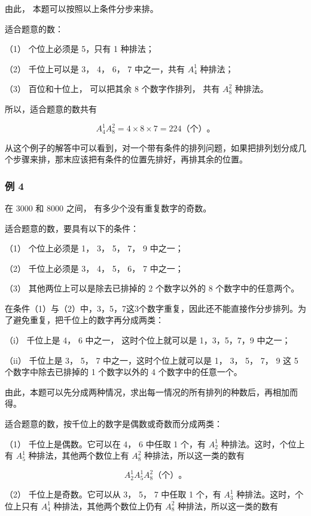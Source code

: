 由此， 本题可以按照以上条件分步来排。

 适合题意的数：

（1） 个位上必须是 5，只有 1 种排法；

（2） 千位上可以是 3， 4， 6， 7 中之一，共有 \(A_4^1\) 种排法；

（3） 百位和十位上， 可以把其余 8 个数字作排列， 共有 \(A_8^2\) 种排法。

所以，适合题意的数共有

\[
A_4^1A_8^2=4\times8\times7=224\text{（个）}\text{。}
\]

从这个例子的解答中可以看到，对一个带有条件的排列问题，如果把排列划分成几个步骤来排，那末应该把有条件的位置先排好，再排其余的位置。

\subsubsection{例 4}

在 3000 和 8000 之间， 有多少个没有重复数字的奇数。

 适合题意的数，要具有以下的条件：

（1） 个位上必须是 1， 3， 5， 7， 9 中之一；

（2） 千位上必须是 3， 4， 5， 6， 7 中之一；

（3） 其他两位上可以是除去已排掉的 2 个数字以外的 8 个数字中的任意两个。

在条件（1）与（2）中，3，5，7这3个数字重复，因此还不能直接作分步排列。为了避免重复，把千位上的数字再分成两类：

（i） 千位上是 4， 6 中之一， 这时个位上就可以是 1，3，5，7，9 中之一；

（ii） 千位上是 3， 5， 7 中之一，这时个位上就可以是 1， 3， 5， 7， 9
这 5 个数字中除去已排掉的 1 个数字以外的 4 个数字中的任意一个。

由此，本题可以先分成两种情况，求出每一情况的所有排列的种数后，再相加而得。


适合题意的数，按千位上的数字是偶数或奇数而分成两类：

（1） 千位上是偶数。它可以在 4， 6 中任取 1 个，有 \(A_2^1\)
种排法。这时，个位上有 \(A_5^1\) 种排法，其他两个数位上有 \(A_8^2\)
种排法，所以这一类的数有

\[
A_2^1A_5^1A_8^2\text{（个）}\text{。}
\]

（2） 千位上是奇数。它可以从 3， 5， 7 中任取 1 个，有 \(A_{3}^{1}\)
种排法。这时，个位上只有 \(A_{4}^{1}\) 种排法，其他两个数位上仍有
\(A_8^2\) 种排法，所以这一类的数有

